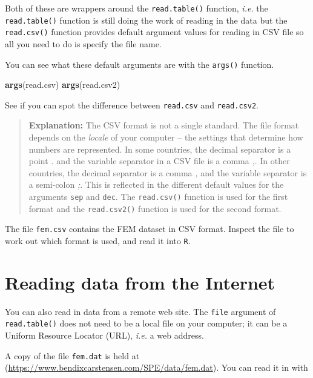 \documentclass[
]{book}
\newenvironment{Shaded}{\begin{snugshade}}{\end{snugshade}}
\newcommand{\FunctionTok}[1]{\textcolor[rgb]{0.13,0.29,0.53}{\textbf{#1}}}
\newcommand{\NormalTok}[1]{#1}
\begin{document}
Both of these are wrappers around the \texttt{read.table()} function,
\emph{i.e.} the \texttt{read.table()} function is still doing the work
of reading in the data but the \texttt{read.csv()} function provides
default argument values for reading in CSV file so all you need to
do is specify the file name.

You can see what these default arguments are with the \texttt{args()}
function.

\begin{Shaded}
\begin{Highlighting}[]
\FunctionTok{args}\NormalTok{(read.csv)}
\FunctionTok{args}\NormalTok{(read.csv2)}
\end{Highlighting}
\end{Shaded}

See if you can spot the difference between \texttt{read.csv} and
\texttt{read.csv2}.

\begin{quote}
\textbf{Explanation:} The CSV format is not a single standard. The
file format depends on the \emph{locale} of your computer -- the
settings that determine how numbers are represented. In some
countries, the decimal separator is a point \emph{.} and the variable
separator in a CSV file is a comma \emph{,}. In other countries, the
decimal separator is a comma \emph{,} and the variable separator is a
semi-colon \emph{;}. This is reflected in the different default values
for the arguments \texttt{sep} and \texttt{dec}. The
\texttt{read.csv()} function is used for the first format and the
\texttt{read.csv2()} function is used for the second format.
\end{quote}

The file \texttt{fem.csv} contains the FEM dataset in CSV format.
Inspect the file to work out which format is used, and read it into
\texttt{R}.

\section{Reading data from the Internet}\label{reading-data-from-the-internet}

You can also read in data from a remote web site. The \texttt{file}
argument of \texttt{read.table()} does not need to be a local file on
your computer; it can be a Uniform Resource Locator (URL), \emph{i.e.}
a web address.

A copy of the file \texttt{fem.dat} is held at
(\url{https://www.bendixcarstensen.com/SPE/data/fem.dat}). You can
read it in with
\end{document}
